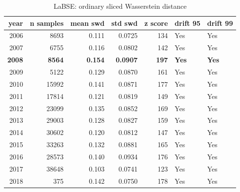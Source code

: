 \begin{table}[ht]
\centering
\caption{LaBSE: ordinary sliced Wasserstein distance}
\label{tab:labse_ordinary_swd}
\begin{tabular}{rrrrrll}
\toprule
year & n samples & mean swd & std swd & z score & drift 95 & drift 99 \\
\midrule
2006 & 8693 & 0.111 & 0.0725 & 134 & Yes & Yes \\
2007 & 6755 & 0.116 & 0.0802 & 142 & Yes & Yes \\
\textbf{2008} & \textbf{8564} & \textbf{0.154} & \textbf{0.0907} & \textbf{197} & \textbf{Yes} & \textbf{Yes} \\
2009 & 5122 & 0.129 & 0.0870 & 161 & Yes & Yes \\
2010 & 15992 & 0.141 & 0.0871 & 177 & Yes & Yes \\
2011 & 17814 & 0.121 & 0.0819 & 149 & Yes & Yes \\
2012 & 23099 & 0.135 & 0.0852 & 169 & Yes & Yes \\
2013 & 29003 & 0.128 & 0.0827 & 159 & Yes & Yes \\
2014 & 30602 & 0.120 & 0.0812 & 147 & Yes & Yes \\
2015 & 33263 & 0.132 & 0.0881 & 165 & Yes & Yes \\
2016 & 28573 & 0.140 & 0.0934 & 176 & Yes & Yes \\
2017 & 38648 & 0.103 & 0.0741 & 123 & Yes & Yes \\
2018 & 375 & 0.142 & 0.0750 & 178 & Yes & Yes \\
\bottomrule
\end{tabular}
\end{table}
